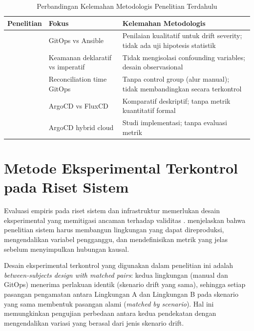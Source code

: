 \begin{table}[H]
  \centering
  \caption{Perbandingan Kelemahan Metodologis Penelitian Terdahulu}
  \label{tab:literatur-comparison}
  \begin{tabular}{|p{3.5cm}|p{3cm}|p{6cm}|}
    \hline
    \textbf{Penelitian} & \textbf{Fokus} & \textbf{Kelemahan Metodologis} \\
    \hline
    \citet{shrestha2024configuration} & GitOps vs Ansible & Penilaian kualitatif untuk drift severity; tidak ada uji hipotesis statistik \\
    \hline
    \citet{kaggantinataraja2025security} & Keamanan deklaratif vs imperatif & Tidak mengisolasi confounding variables; desain observasional \\
    \hline
    \citet{matubber2025managing} & Reconciliation time GitOps & Tanpa control group (alur manual); tidak membandingkan secara terkontrol \\
    \hline
    \citet{paavola2021managing} & ArgoCD vs FluxCD & Komparatif deskriptif; tanpa metrik kuantitatif formal \\
    \hline
    \citet{damore2021gitops} & ArgoCD hybrid cloud & Studi implementasi; tanpa evaluasi metrik \\
    \hline
  \end{tabular}
\end{table}

\section{Metode Eksperimental Terkontrol pada Riset Sistem}

Evaluasi empiris pada riset sistem dan infrastruktur memerlukan desain eksperimental yang memitigasi ancaman terhadap validitas \citep{wohlin2012experimentation}. \citet{limoncelli2018} menjelaskan bahwa penelitian sistem harus membangun lingkungan yang dapat direproduksi, mengendalikan variabel pengganggu, dan mendefinisikan metrik yang jelas sebelum menyimpulkan hubungan kausal.

Desain eksperimental terkontrol yang digunakan dalam penelitian ini adalah \textit{between-subjects design with matched pairs}: kedua lingkungan (manual dan GitOps) menerima perlakuan identik (skenario drift yang sama), sehingga setiap pasangan pengamatan antara Lingkungan A dan Lingkungan B pada skenario yang sama membentuk pasangan alami (\textit{matched by scenario}). Hal ini memungkinkan pengujian perbedaan antara kedua pendekatan dengan mengendalikan variasi yang berasal dari jenis skenario drift.

